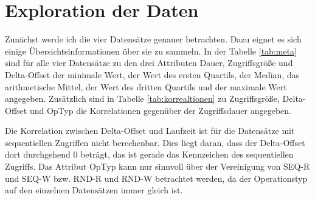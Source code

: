 \documentclass[
	12pt,
	a4paper,
	BCOR10mm,
	DIV14,
	listof=totoc,
	bibliography=totoc,
	headsepline
]{scrreprt}
\begin{document}
\section{Exploration der Daten}
\label{eval:exploration}
Zunächst werde ich die vier Datensätze genauer betrachten. Dazu eignet es sich einige Übersichtsinformationen über sie zu sammeln.
In der Tabelle \ref{tab:meta} sind für alle vier Datensätze zu den drei Attributen Dauer, Zugriffsgröße und Delta-Offset der minimale Wert, der Wert des ersten Quartils, der Median, das arithmetische Mittel, der Wert des dritten Quartils und der maximale Wert angegeben. Zusätzlich sind in Tabelle \ref{tab:korrealtionen} zu Zugriffsgröße, Delta-Offset und OpTyp die Korrelationen gegenüber der Zugriffsdauer angegeben.\medskip

Die Korrelation zwischen Delta-Offset und Laufzeit ist für die Datensätze mit sequentiellen Zugriffen nicht berechenbar. Dies liegt daran, dass der Delta-Offset dort durchgehend 0 beträgt, das ist gerade das Kennzeichen des sequentiellen Zugriffs.
Das Attribut OpTyp kann nur sinnvoll über der Vereinigung von SEQ-R
und SEQ-W bzw. RND-R und RND-W betrachtet werden, da der Operationstyp auf den einzelnen Datensätzen immer gleich ist.
\end{document}
